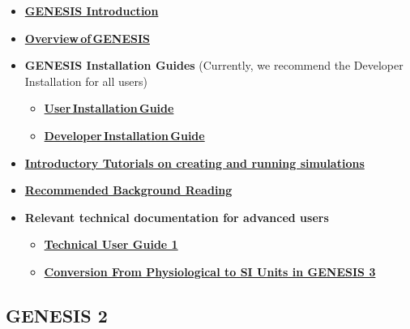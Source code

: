 \documentclass[12pt]{article}
\begin{document}
\begin{itemize}

   \item \href{../genesis-intro/genesis-intro.tex} {\bf GENESIS Introduction}

   \item \href{../genesis-overview/genesis-overview.tex}{\bf Overview\,of\,GENESIS}

   \item {\bf GENESIS Installation Guides} (Currently, we recommend the Developer Installation for all users)

      \begin{itemize}
         \item \href{../installation-debian/installation-debian.tex}{\bf User\,Installation\,Guide}
         \item \href{../developer-installation/developer-installation.tex}{\bf Developer\,Installation\,Guide}
      \end{itemize}

   \item \href{../tutorial-genesis/tutorial-genesis.tex} {\bf Introductory
          Tutorials on creating and running simulations}

   \item \href{../background-material/background-material.tex}
          {\bf Recommended Background Reading}

    \item  {\bf Relevant technical documentation for advanced users}
      \begin{itemize}
         \item \href{../technical-guide-1/technical-guide-1.tex}
                {\bf Technical User Guide 1}
         \item \href{../units-conversion/units-conversion.tex}
                {\bf Conversion From Physiological to SI Units in GENESIS 3}
      \end{itemize}
\end{itemize}

\subsection*{GENESIS 2}
\end{document}
